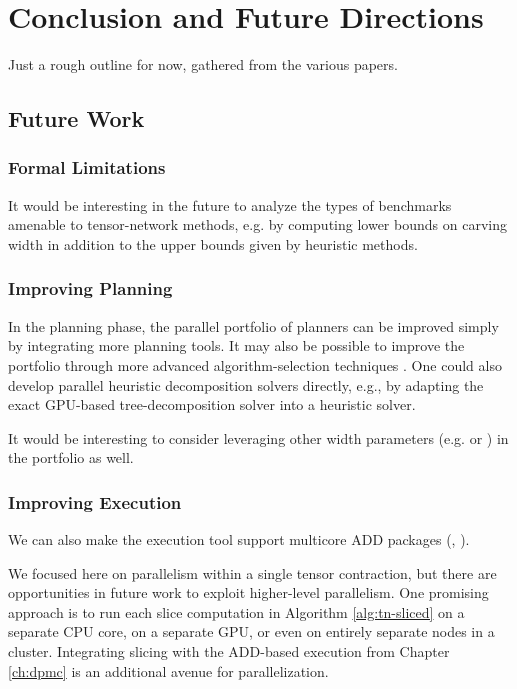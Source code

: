 \chapter{Conclusion and Future Directions}
\label{ch:conclusion}
Just a rough outline for now, gathered from the various papers.

\section{Future Work}

\subsection{Formal Limitations}
It would be interesting in the future to analyze the types of benchmarks amenable to tensor-network methods, e.g. by computing lower bounds on carving width in addition to the upper bounds given by heuristic methods. 

\subsection{Improving Planning}
In the planning phase, the parallel portfolio of planners can be improved simply by integrating more planning tools. %
It may also be possible to improve the portfolio through more advanced algorithm-selection techniques \cite{HHLKS09,XHHL12}. 
One could also develop parallel heuristic decomposition solvers directly, e.g., by adapting the exact GPU-based tree-decomposition solver \cite{VB17} into a heuristic solver. 

It would be interesting to consider leveraging other width parameters (e.g. \cite{AGG07} or \cite{GS17}) in the portfolio as well.

\subsection{Improving Execution}
We can also make the execution tool \Dmc{} support multicore ADD packages (\eg, \sylvan{} \cite{van2015sylvan}).

We focused here on parallelism within a single tensor contraction, but there are opportunities in future work to exploit higher-level parallelism. 
One promising approach is to run each slice computation in Algorithm \ref{alg:tn-sliced} on a separate CPU core, on a separate GPU, or even on entirely separate nodes in a cluster. %
Integrating slicing with the ADD-based execution from Chapter \ref{ch:dpmc} is an additional avenue for parallelization.


